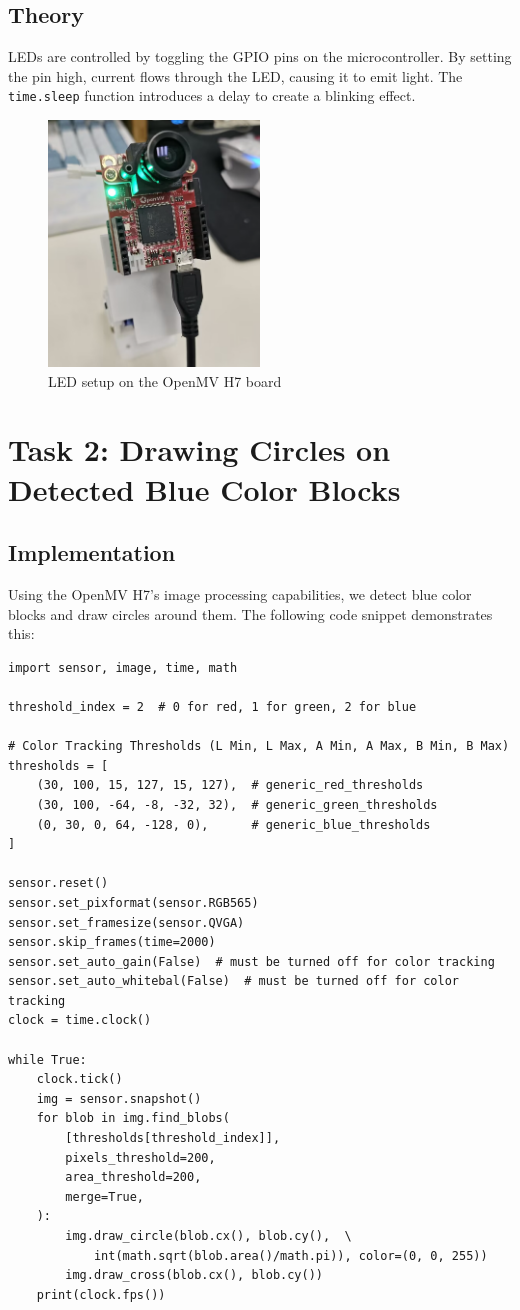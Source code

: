 \documentclass{article}
\begin{document}
\subsection{Theory}
LEDs are controlled by toggling the GPIO pins on the microcontroller. By setting the pin high, current flows through the LED, causing it to emit light. The \texttt{time.sleep} function introduces a delay to create a blinking effect.

\begin{figure}[H]
    \centering
    \includegraphics[width=0.5\textwidth]{LED.png}
    \caption{LED setup on the OpenMV H7 board}
\end{figure}

\section{Task 2: Drawing Circles on Detected Blue Color Blocks}
\subsection{Implementation}
Using the OpenMV H7's image processing capabilities, we detect blue color blocks and draw circles around them. The following code snippet demonstrates this:
\begin{verbatim}
import sensor, image, time, math

threshold_index = 2  # 0 for red, 1 for green, 2 for blue

# Color Tracking Thresholds (L Min, L Max, A Min, A Max, B Min, B Max)
thresholds = [
    (30, 100, 15, 127, 15, 127),  # generic_red_thresholds
    (30, 100, -64, -8, -32, 32),  # generic_green_thresholds
    (0, 30, 0, 64, -128, 0),      # generic_blue_thresholds
]

sensor.reset()
sensor.set_pixformat(sensor.RGB565)
sensor.set_framesize(sensor.QVGA)
sensor.skip_frames(time=2000)
sensor.set_auto_gain(False)  # must be turned off for color tracking
sensor.set_auto_whitebal(False)  # must be turned off for color tracking
clock = time.clock()

while True:
    clock.tick()
    img = sensor.snapshot()
    for blob in img.find_blobs(
        [thresholds[threshold_index]],
        pixels_threshold=200,
        area_threshold=200,
        merge=True,
    ):
        img.draw_circle(blob.cx(), blob.cy(),  \
            int(math.sqrt(blob.area()/math.pi)), color=(0, 0, 255))
        img.draw_cross(blob.cx(), blob.cy())
    print(clock.fps())
\end{verbatim}
\end{document}
